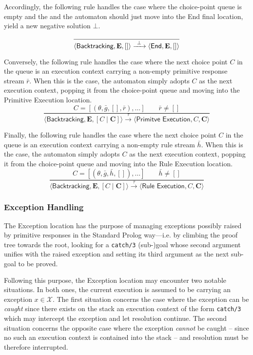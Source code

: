 \documentclass{article}
\newcommand{\stateStyle}[1]{\textsf{#1}}
\newcommand{\state}[1]{\stateStyle{#1}}
\newcommand{\stream}[1]{\bar{#1}}
\newcommand{\vect}[1]{\mathbf{#1}}
\newcommand{\notableset}[1]{\mathcal{#1}}
\newcommand{\transition}[1]{\xrightarrow{\ #1\ }}
\newcommand{\pl}[1]{\texttt{#1}}
\begin{document}
Accordingly, the following rule handles the case where the choice-point queue is empty and the and the automaton should just move into the \state{End} final location, yield a new negative solution $\bot$.
%
\[
    \frac{
    }{
        \langle \state{Backtracking}, \vect{E}, [] \rangle
        \transition{\bot}
        \langle \state{End}, \vect{E}, [] \rangle
    }
\]

Conversely, the following rule handles the case where the next choice point $C$ in the queue is an execution context carrying a non-empty primitive response stream $\stream{r}$.
%
When this is the case, the automaton simply adopts $C$ as the next execution context, popping it from the choice-point queue and moving into the \state{Primitive Execution} location.
%
\[
    \frac{
        C = [(\theta, \stream{g}, [], \stream{r}), \ldots]
        \qquad
        \stream{r} \neq []
    }{
        \langle \state{Backtracking}, \vect{E}, [C \mid \vect{C}] \rangle
        \transition{\tau}
        \langle \state{Primitve Execution}, C, \vect{C} \rangle
    }
\]

Finally, the following rule handles the case where the next choice point $C$ in the queue is an execution context carrying a non-empty rule stream $\stream{h}$.
%
When this is the case, the automaton simply adopts $C$ as the next execution context, popping it from the choice-point queue and moving into the \state{Rule Execution} location.
%
\[
    \frac{
        C = [(\theta, \stream{g}, \stream{h}, []), \ldots]
        \qquad
        \stream{h} \neq []
    }{
        \langle \state{Backtracking}, \vect{E}, [C \mid \vect{C}] \rangle
        \transition{\tau}
        \langle \state{Rule Execution}, C, \vect{C} \rangle
    }
\]

\subsubsection{Exception Handling}

The \state{Exception} location has the purpose of managing exceptions possibly raised by primitive responses in the Standard Prolog way---i.e. by climbing the proof tree towards the root, looking for a \pl{catch/3} (sub-)goal whose second argument unifies with the raised exception and setting its third argument as the next sub-goal to be proved.

Following this purpose, the \state{Exception} location may encounter two notable situations.
%
In both ones, the current execution is assumed to be carrying an exception $x \in \notableset{X}$.
%
The first situation concerns the case where the exception can be \emph{caught} since there exists on the stack an execution context of the form \pl{catch/3} which may intercept the exception and let resolution continue.
%
The second situation concerns the opposite case where the exception \emph{cannot} be caught -- since no such an execution context is contained into the stack -- and resolution must be therefore interrupted.
\end{document}
